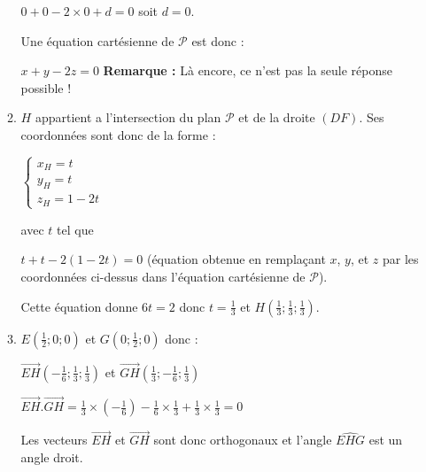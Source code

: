 \begin{corrige}
\begin{enumerate}
\begin{enumerate}[label=\alph*.]
                         \par
                         $0+0-2\times 0+d=0$ soit $d=0$.
                         \par
                         Une équation cartésienne de $\mathscr P$ est donc :
                         \par
                         $x+y-2z=0$
                         \textbf{Remarque : }
                         Là encore, ce n'est pas la seule réponse possible !
                         \item
                         $H$ appartient a l'intersection du plan $\mathscr P$ et de la droite $\left(DF\right)$. Ses coordonnées sont donc de la forme :
                         \par
                         $\left\{ \begin{matrix} x_{H}=t  \\ y_{H}=t  \\ z_{H}=1-2t \end{matrix}\right.$
                              \par
                              avec $t$ tel que
                              \par
                              $t+t-2\left(1-2t\right)=0$ (équation obtenue en remplaçant $x$, $y$, et $z$ par les coordonnées ci-dessus dans l'équation cartésienne de $\mathscr P$).
                              \par
                              Cette équation donne $6t=2$ donc $t=\frac{1}{3}$ et $H \left(\frac{1}{3};\frac{1}{3};\frac{1}{3}\right)$.
                              \item
                              $E\left(\frac{1}{2};0;0\right)$ et $G\left(0;\frac{1}{2};0\right)$ donc :
                              \par
                              $\overrightarrow{EH}\left(-\frac{1}{6};\frac{1}{3};\frac{1}{3}\right)$ et $\overrightarrow{GH}\left(\frac{1}{3};-\frac{1}{6};\frac{1}{3}\right)$
                              \par
                              $\overrightarrow{EH}.\overrightarrow{GH} =\frac{1}{3}\times \left(-\frac{1}{6}\right)-\frac{1}{6}\times \frac{1}{3}+\frac{1}{3}\times \frac{1}{3}=0$
                              \par
                              Les vecteurs $\overrightarrow{EH}$ et $\overrightarrow{GH}$ sont donc orthogonaux et l'angle $\widehat{EHG}$ est un angle droit.
                         \end{enumerate}

\end{enumerate}
\end{corrige}
